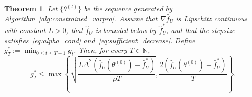\documentclass{article}
\newtheorem{Th}{Theorem}[section]
\begin{document}
\begin{Th}\label{th:convergence}
Let \(\{\theta^{(t)}\}\) be the sequence generated by
Algorithm~\ref{alg:constrained_varpro}. Assume that \(\nabla \widehat f_U\) is Lipschitz
continuous with constant \(L>0\), that \(\widehat f_U\) is bounded below by \(\widehat f_U^*\), and
that the stepsize satisfies~\eqref{eq:alpha_cond} and~\eqref{eq:sufficient_decrease}. Define $g_T^*
    :=
    \min_{0\le t\le T-1} g_t$. Then, for every \(T\in\mathbb{N}\),
\begin{equation}\label{eq:rate}
    g_T^*
    \le
    \max\left\{
        \sqrt{
        \frac{
            L\bar\Delta^2
            \left(
                \widehat f_U(\theta^{(0)})-\widehat f_U^*
            \right)
        }{
            \rho T
        }},
        \frac{
            2 \left (\widehat f_U(\theta^{(0)})-\widehat f_U^*
        \right)}{
            T
        }
    \right\}.
\end{equation}
\end{Th}
\end{document}
